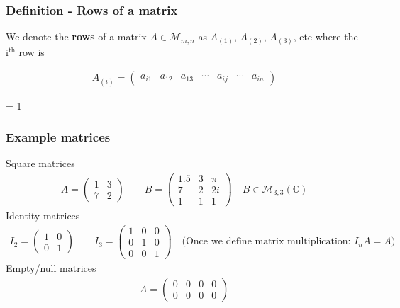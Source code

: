 \documentclass[usenames,dvipsnames,aspectratio=169,10pt]{beamer}
\def \EXAMPLEVERSION {3} %
\numberwithin{equation}{section}
\begin{document}
\begin{frame}
\frametitle{Definition - Rows of a matrix}

We denote the \textbf{rows} of a matrix $A \in \mathcal{M}_{m,n}$ as $A_{(1)}$, $A_{(2)}$, $A_{(3)}$, etc where the i$^\text{th}$ row is

\begin{align*}
A_{(i)} =
\begin{pmatrix}
a_{i1} & a_{12} & a_{13} & \cdots & a_{ij} & \cdots & a_{in}
\end{pmatrix}
\end{align*}

\end{frame}








\ifnum \EXAMPLEVERSION = 1
\begin{frame}
\frametitle{Example matrices}

Square matrices
\begin{align*}
A =
\begin{pmatrix}
1 & 3 \\
7 & 2
\end{pmatrix}
\quad\quad
B =
\begin{pmatrix}
1.5 & 3 & \pi \\
7 & 2 & 2i \\
1 & 1 & 1
\end{pmatrix}
\quad
B \in \mathcal{M}_{3,3}(\mathbb{C})
\end{align*}
Identity matrices
\begin{align*}
I_2 =
\begin{pmatrix}
1 & 0 \\
0 & 1
\end{pmatrix}
\quad\quad
I_3 =
\begin{pmatrix}
1 & 0 & 0 \\
0 & 1 & 0 \\
0 & 0 & 1
\end{pmatrix}
\quad
\text{(Once we define matrix multiplication: $I_n A = A$)}
\end{align*}
Empty/null matrices
\begin{align*}
A =
\begin{pmatrix}
0 & 0 & 0 & 0 \\
0 & 0 & 0 & 0
\end{pmatrix}
\end{align*}
\end{frame}
\fi
\end{document}

